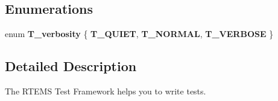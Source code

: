 \subsection*{Enumerations}
\begin{DoxyCompactItemize}
\item 
\mbox{\label{group__RTEMSTestFramework_ga155a7f6bf8d02683389b61cfc3e7dc62}} 
enum {\bfseries T\+\_\+verbosity} \{ {\bfseries T\+\_\+\+Q\+U\+I\+ET}, 
{\bfseries T\+\_\+\+N\+O\+R\+M\+AL}, 
{\bfseries T\+\_\+\+V\+E\+R\+B\+O\+SE}
 \}
\end{DoxyCompactItemize}


\subsection{Detailed Description}
The R\+T\+E\+MS Test Framework helps you to write tests. 

